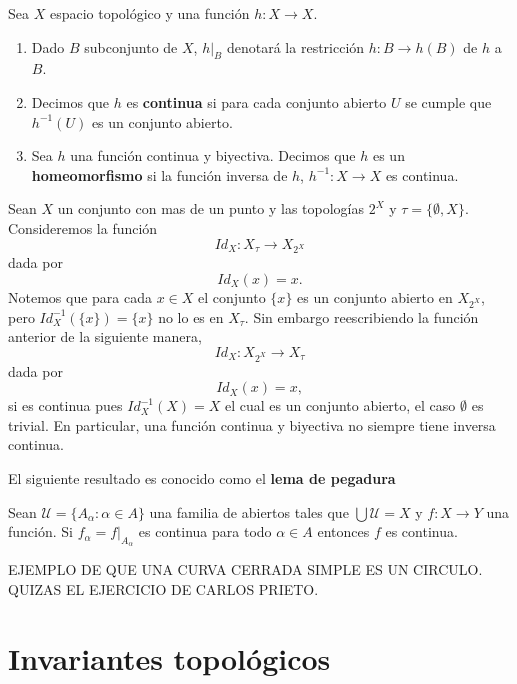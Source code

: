 \begin{df}
Sea $X$ espacio topológico y una función $h:X \to X$. 
\begin{enumerate}

	\item Dado $B$ subconjunto de $X$, $h|_B$ denotará la restricción $h:B \to h(B)$ de $h$ a $B$. 
	
	\item  Decimos que $h$ es \textbf{continua} si para cada conjunto abierto $U$ se cumple que $h^{-1}(U)$ es un conjunto abierto.
	
	\item  Sea $h$ una función continua y biyectiva. Decimos que $h$ es un \textbf{homeomorfismo} si la función inversa de $h$, $h^{-1}:X \to X$ es continua. 	
\end{enumerate}
\end{df}


\begin{ej}
Sean $X$ un conjunto con mas de un punto y las topologías $2^X$ y $\tau=\{\emptyset, X\}$. Consideremos la función $$Id_X:X_{\tau} \to X_{2^X}$$ dada por $$Id_X(x)=x.$$
Notemos que para cada $x \in X$ el conjunto $\{x\}$ es un conjunto abierto en $X_{2^X}$, pero $Id_X^{-1}(\{x\})= \{x\}$ no lo es en $X_\tau$. Sin embargo reescribiendo  la función anterior de la siguiente manera,  $$Id_X:X_{2^X} \to X_{\tau}$$ dada por $$Id_X(x)=x,$$
si es continua pues $Id_X^{-1}(X)=X$ el cual es un conjunto abierto, el caso $\emptyset$ es trivial. En particular, una función continua y biyectiva no siempre tiene inversa continua. 
\end{ej}

El siguiente resultado es conocido como el \textbf{lema de pegadura}

\begin{pr}
Sean $\mathcal{U}= \{A_\alpha :\alpha \in A\}$ una familia de abiertos tales que $\bigcup \mathcal{U} = X$ y $f:X \to Y$ una función. Si $f_\alpha=f|_{A_\alpha}$ es continua para todo $\alpha \in A$ entonces $f$ es continua.  
\end{pr}


EJEMPLO DE QUE UNA CURVA CERRADA SIMPLE ES UN CIRCULO. QUIZAS EL EJERCICIO DE CARLOS PRIETO.

\section*{Invariantes topológicos}

